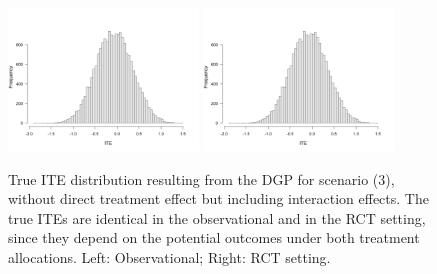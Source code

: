 \begin{figure}[htbp]
\centering
\includegraphics[width=0.45\textwidth]{img/results/observ_scenario3_ite_distribution_dgp.png}
\includegraphics[width=0.45\textwidth]{img/results/rct_scenario3_ite_distribution_dgp.png}
\caption{True ITE distribution resulting from the DGP for scenario (3), without direct treatment effect but including interaction effects. The true ITEs are identical in the observational and in the RCT setting, since they depend on the potential outcomes under both treatment allocations. Left: Observational; Right: RCT setting.}
\label{fig:scenario3_ite_distribution_dgp}
\end{figure}




